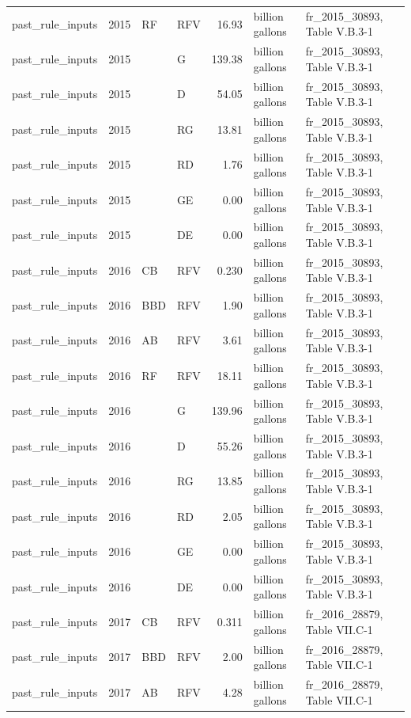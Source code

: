 \begin{longtable}{p{2.3cm}p{0.7cm}p{1.0cm}p{2.6cm}rp{1.7cm}p{4.6cm}}
past\_rule\_inputs & 2015 & RF & RFV & 16.93 & billion gallons & fr\_2015\_30893, Table V.B.3-1 \\
past\_rule\_inputs & 2015 &  & G & 139.38 & billion gallons & fr\_2015\_30893, Table V.B.3-1 \\
past\_rule\_inputs & 2015 &  & D & 54.05 & billion gallons & fr\_2015\_30893, Table V.B.3-1 \\
past\_rule\_inputs & 2015 &  & RG & 13.81 & billion gallons & fr\_2015\_30893, Table V.B.3-1 \\
past\_rule\_inputs & 2015 &  & RD & 1.76 & billion gallons & fr\_2015\_30893, Table V.B.3-1 \\
past\_rule\_inputs & 2015 &  & GE & 0.00 & billion gallons & fr\_2015\_30893, Table V.B.3-1 \\
past\_rule\_inputs & 2015 &  & DE & 0.00 & billion gallons & fr\_2015\_30893, Table V.B.3-1 \\
past\_rule\_inputs & 2016 & CB & RFV & 0.230 & billion gallons & fr\_2015\_30893, Table V.B.3-1 \\
past\_rule\_inputs & 2016 & BBD & RFV & 1.90 & billion gallons & fr\_2015\_30893, Table V.B.3-1 \\
past\_rule\_inputs & 2016 & AB & RFV & 3.61 & billion gallons & fr\_2015\_30893, Table V.B.3-1 \\
past\_rule\_inputs & 2016 & RF & RFV & 18.11 & billion gallons & fr\_2015\_30893, Table V.B.3-1 \\
past\_rule\_inputs & 2016 &  & G & 139.96 & billion gallons & fr\_2015\_30893, Table V.B.3-1 \\
past\_rule\_inputs & 2016 &  & D & 55.26 & billion gallons & fr\_2015\_30893, Table V.B.3-1 \\
past\_rule\_inputs & 2016 &  & RG & 13.85 & billion gallons & fr\_2015\_30893, Table V.B.3-1 \\
past\_rule\_inputs & 2016 &  & RD & 2.05 & billion gallons & fr\_2015\_30893, Table V.B.3-1 \\
past\_rule\_inputs & 2016 &  & GE & 0.00 & billion gallons & fr\_2015\_30893, Table V.B.3-1 \\
past\_rule\_inputs & 2016 &  & DE & 0.00 & billion gallons & fr\_2015\_30893, Table V.B.3-1 \\
past\_rule\_inputs & 2017 & CB & RFV & 0.311 & billion gallons & fr\_2016\_28879, Table VII.C-1 \\
past\_rule\_inputs & 2017 & BBD & RFV & 2.00 & billion gallons & fr\_2016\_28879, Table VII.C-1 \\
past\_rule\_inputs & 2017 & AB & RFV & 4.28 & billion gallons & fr\_2016\_28879, Table VII.C-1 \\

\end{longtable}
